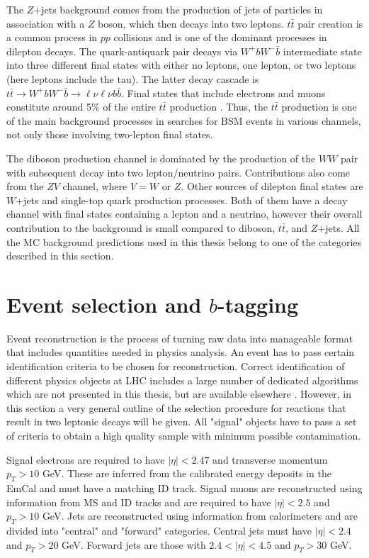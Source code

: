 The $Z$+jets background comes from the production of jets of particles in association with a $Z$ boson, which then decays into two leptons. $t\bar{t}$ pair creation is a common process in $pp$ collisions and is one of the dominant processes in dilepton decays. The quark-antiquark pair decays via $W^+bW^-\bar{b}$ intermediate state into three different final states with either no leptons, one lepton, or two leptons (here leptons include the tau). The latter decay cascade is $t\bar{t} \to W^+bW^-\bar{b} \to \ell \nu \ell \nu b \bar{b}$. Final states that include electrons and muons constitute around 5\% of the entire $t\bar{t}$ production \citep{Wagner:2010wd}. Thus, the $t\bar{t}$ production is one of the main background processes in searches for BSM events in various channels, not only those involving two-lepton final states. 

The diboson production channel is dominated by the production of the $WW$ pair with subsequent decay into two lepton/neutrino pairs. Contributions also come from the $ZV$ channel, where $V = W$ or $Z$.
Other sources of dilepton final states are $W$+jets and single-top quark production processes. Both of them have a decay channel with final states containing a lepton and a neutrino, however their overall contribution to the background is small compared to diboson, $t\bar{t}$, and $Z$+jets. 
All the MC background predictions used in this thesis belong to one of the categories described in this section. 




\section{Event selection and $b$-tagging}

Event reconstruction is the process of turning raw data into manageable format that includes quantities needed in physics analysis. An event has to pass certain identification criteria to be chosen for reconstruction. Correct identification of different physics objects at LHC includes a large number of dedicated algorithms which are not presented in this thesis, but are available elsewhere \citep{Aad:2016tuk}. 
However, in this section a very general outline of the selection procedure for reactions that result in two leptonic decays will be given. All "signal" objects have to pass a set of criteria to obtain a high quality sample with minimum possible contamination.

Signal electrons are required to have $|\eta|<2.47$ and transverse momentum $p_{T}>10$ GeV. These are inferred from the calibrated  energy deposits in the EmCal and must have a matching ID track. Signal muons are reconstructed using information from MS and ID tracks and are required to have   $|\eta|<2.5$ and $p_{T}>10$ GeV. Jets are reconstructed using information from calorimeters and are divided into "central" and "forward" categories. Central jets must have $|\eta|<2.4$ and $p_{T}>20$ GeV. Forward jets are those with $2.4<|\eta|<4.5$ and $p_{T}>30$ GeV. 


